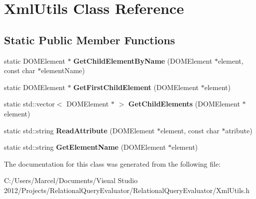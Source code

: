 \hypertarget{class_xml_utils}{\section{Xml\+Utils Class Reference}
\label{class_xml_utils}
}
\subsection*{Static Public Member Functions}
\begin{DoxyCompactItemize}
\item 
\hypertarget{class_xml_utils_aa0877ccc4d112cb9a23f96d3930334c8}{static D\+O\+M\+Element $\ast$ {\bfseries Get\+Child\+Element\+By\+Name} (D\+O\+M\+Element $\ast$element, const char $\ast$element\+Name)}\label{class_xml_utils_aa0877ccc4d112cb9a23f96d3930334c8}

\item 
\hypertarget{class_xml_utils_a7d0590cc1b96262e5269385f4694bc61}{static D\+O\+M\+Element $\ast$ {\bfseries Get\+First\+Child\+Element} (D\+O\+M\+Element $\ast$element)}\label{class_xml_utils_a7d0590cc1b96262e5269385f4694bc61}

\item 
\hypertarget{class_xml_utils_afc34e93f65aa5e89db99e75bcc3a081e}{static std\+::vector$<$ D\+O\+M\+Element $\ast$ $>$ {\bfseries Get\+Child\+Elements} (D\+O\+M\+Element $\ast$element)}\label{class_xml_utils_afc34e93f65aa5e89db99e75bcc3a081e}

\item 
\hypertarget{class_xml_utils_a2fe89148be911ecdb98dd4c20ba51795}{static std\+::string {\bfseries Read\+Attribute} (D\+O\+M\+Element $\ast$element, const char $\ast$atribute)}\label{class_xml_utils_a2fe89148be911ecdb98dd4c20ba51795}

\item 
\hypertarget{class_xml_utils_a3288b8d8db441e0eeeb3907c458ccde4}{static std\+::string {\bfseries Get\+Element\+Name} (D\+O\+M\+Element $\ast$element)}\label{class_xml_utils_a3288b8d8db441e0eeeb3907c458ccde4}

\end{DoxyCompactItemize}


The documentation for this class was generated from the following file\+:\begin{DoxyCompactItemize}
\item 
C\+:/\+Users/\+Marcel/\+Documents/\+Visual Studio 2012/\+Projects/\+Relational\+Query\+Evaluator/\+Relational\+Query\+Evaluator/Xml\+Utils.\+h\end{DoxyCompactItemize}
